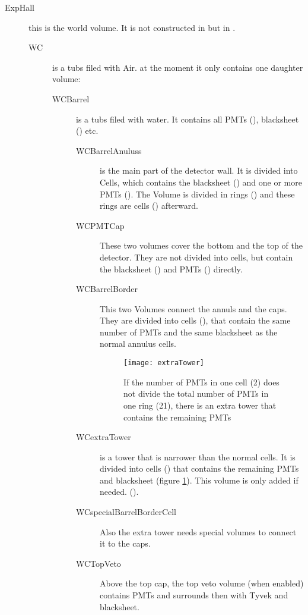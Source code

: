 \begin{description}
 \item[ExpHall] this is the world volume. It is not constructed in  
 but in .
 \begin{description}
  \item[WC] is a tubs filed with Air. at the moment it 
        only contains one daughter volume:
  \begin{description}
   \item[WCBarrel] is a tubs filed with water. It contains all PMTs
    (), blacksheet () etc.
   \begin{description}
    \item[WCBarrelAnuluss] is the main part of the detector wall. It is 
      divided into Cells, which contains the blacksheet () and one or 
      more PMTs (). 
      The Volume is divided in rings () and these rings 
      are cells  () afterward. 
    \item[WCPMTCap] These two volumes cover the bottom and the top of the 
     detector. They are not divided into cells, but contain the blacksheet
      () and PMTs
      () directly.
    \item[WCBarrelBorder] This two Volumes connect the annuls and the caps. 
      They are divided into cells (), that contain the same number of PMTs and the same
    blacksheet as the normal annulus cells.
    
\begin{figure}
   \begin{center}
\texttt{[image: extraTower]} 
  \end{center}
\caption{If the number of PMTs in one cell (2) does not divide the total number of PMTs in one ring (21), there is an extra tower that contains the remaining PMTs}\label{fig:extra}
\end{figure}

    \item[WCextraTower] is a tower that is narrower than the normal cells. It is divided 
     into cells () that contains the remaining PMTs and blacksheet (figure \ref{fig:extra}). This volume is only added if needed.
     ().
    \item[WCspecialBarrelBorderCell] Also the extra tower needs special volumes to connect it 
    to the caps.
    \item[WCTopVeto] Above the top cap, the top veto volume (when enabled) contains PMTs and surrounds then with Tyvek and blacksheet.
    \end{description}
  \end{description}
 \end{description}
\end{description}



